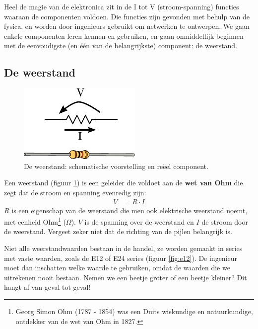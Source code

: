\documentclass{article}
\begin{document}
		Heel de magie van de elektronica zit in de I tot V (stroom-spanning) functies waaraan de componenten voldoen. Die functies zijn gevonden met behulp van de fysica, en worden door ingenieurs gebruikt om netwerken te ontwerpen. We gaan enkele componenten leren kennen en gebruiken, en gaan onmiddellijk beginnen met de eenvoudigste (en één van de belangrijkste) component: de weerstand.


		\subsection{De weerstand}
			\begin{figure}[htbp]
				\centering
				\includegraphics{weerstand}
				\caption{De weerstand: schematische voorstelling en re\"eel component.}
				\label{fig:weerstand}
			\end{figure}
			 Een weerstand (figuur \ref{fig:weerstand}) is een geleider die voldoet aan de \textbf{wet van Ohm} die zegt dat de stroom en spanning evenredig zijn: 
			\begin{align}
				V &= R \cdot I
			\end{align} 
			$R$ is een eigenschap van de weerstand die men ook elektrische weerstand noemt, met eenheid Ohm\footnote{Georg Simon Ohm (1787 - 1854) was een Duits wiskundige en natuurkundige, ontdekker van de wet van Ohm in 1827.} ($\Omega$). $V$ is de spanning over de weerstand en $I$ de stroom door de weerstand. Vergeet zeker niet dat de richting van de pijlen belangrijk is.

			Niet alle weerstandwaarden bestaan in de handel, ze worden gemaakt in series met vaste waarden, zoals de E12 of E24 series (figuur \ref{fig:e12}). De ingenieur moet dan inschatten welke waarde te gebruiken, omdat de waarden die we uitrekenen nooit bestaan. Nemen we een beetje groter of een beetje kleiner? Dit hangt af van geval tot geval!
\end{document}

